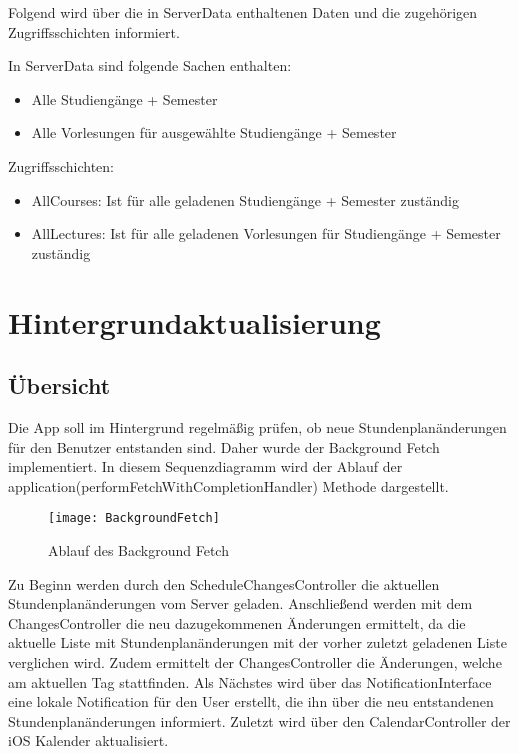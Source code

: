 Folgend wird über die in ServerData enthaltenen Daten und die zugehörigen Zugriffsschichten informiert.

In ServerData sind folgende Sachen enthalten:
\begin{itemize}
     \item Alle Studiengänge + Semester
     \item Alle Vorlesungen für ausgewählte Studiengänge + Semester \\     
\end{itemize}

Zugriffsschichten: 
\begin{itemize}
     \item AllCourses: Ist für alle geladenen Studiengänge + Semester zuständig
     \item AllLectures: Ist für alle geladenen Vorlesungen für Studiengänge + Semester zuständig\\
\end{itemize}

\newpage
\chapter{Hintergrundaktualisierung}
\section{Übersicht}
Die App soll im Hintergrund regelmäßig prüfen, ob neue Stundenplanänderungen für den Benutzer entstanden sind.
Daher wurde der Background Fetch implementiert. In diesem Sequenzdiagramm wird der Ablauf der application(performFetchWithCompletionHandler) Methode dargestellt. 

\begin{figure}[htb]
    \centering
    \texttt{[image: BackgroundFetch]}
    \caption{Ablauf des Background Fetch}
\end{figure}

Zu Beginn werden durch den ScheduleChangesController die aktuellen Stundenplanänderungen vom Server geladen. 
Anschließend werden mit dem ChangesController die neu dazugekommenen Änderungen ermittelt, da die aktuelle Liste mit Stundenplanänderungen mit der vorher zuletzt geladenen Liste verglichen wird. Zudem ermittelt der ChangesController die Änderungen, welche am aktuellen Tag stattfinden. 
Als Nächstes wird über das NotificationInterface eine lokale Notification für den User erstellt, die ihn über die neu entstandenen Stundenplanänderungen informiert.
Zuletzt wird über den CalendarController der iOS Kalender aktualisiert.
